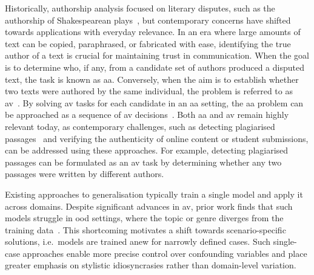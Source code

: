 Historically, authorship analysis focused on literary disputes, such as the authorship of Shakespearean plays~\citep{neal_surveying_2018,stamatatos_survey_2009}, but contemporary concerns have shifted towards applications with everyday relevance.
In an era where large amounts of text can be copied, paraphrased, or fabricated with ease, identifying the true author of a text is crucial for maintaining trust in communication. 
%
When the goal is to determine who, if any, from a candidate set of authors produced a disputed text, the task is known as \ac{aa}. 
Conversely, when the aim is to establish whether two texts were authored by the same individual, the problem is referred to as \ac{av}~\citep{koppel_authorship_2004}. 
By solving \ac{av} tasks for each candidate in an \ac{aa} setting, the \ac{aa} problem can be approached as a sequence of \ac{av} decisions~\citep{tyo_state_2022,barlas_cross_domain_2020}.
%
Both \ac{aa} and \ac{av} remain highly relevant today, as contemporary challenges, such as detecting plagiarised passages~\citep{stein_intrinsic_2011} and verifying the authenticity of online content or student submissions, can be addressed using these approaches. 
For example, detecting plagiarised passages can be formulated as an \ac{av} task by determining whether any two passages were written by different authors.



Existing approaches to generalisation typically train a single model and apply it across domains.
Despite significant advances in \ac{av}, prior work finds that such models struggle in \ac{ood} settings, where the topic or genre diverges from the training data~\citep{Sundararajan_style_18,bischoff_importance_2020,li_learning_2025}. 
This shortcoming motivates a shift towards scenario-specific solutions, i.e.\ models are trained anew for narrowly defined cases. 
Such single-case approaches enable more precise control over confounding variables and place greater emphasis on stylistic idiosyncrasies rather than domain-level variation.

